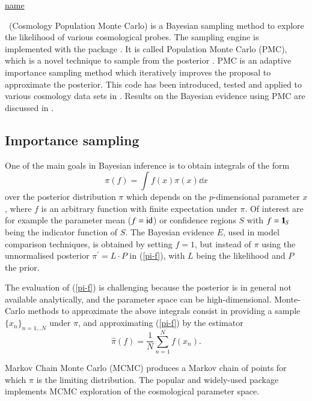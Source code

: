 \documentclass[11pt, chapterprefix, headsepline]{scrartcl}
\begin{document}
\hyperlink{spec}{name}

\CosmoPMC\ (Cosmology Population Monte Carlo) is a Bayesian sampling
method to explore the likelihood of various cosmological probes. The
sampling engine is implemented with the package \pmclib. It is called
Population Monte Carlo (PMC), which is a novel technique to sample from
the posterior \citep{cappe:douc:guillin:marin:robert:2007}. PMC is an
adaptive importance sampling method which iteratively improves the
proposal to approximate the posterior. This code has
been introduced, tested and applied to various cosmology data sets in
\citet{WK09}. Results on the Bayesian evidence using PMC are discussed
in \cite{KWR10}.

\subsection{Importance sampling}


One of the main goals in Bayesian inference is to obtain integrals of
the form
%
\begin{equation}
  \pi(f) = \int f(x) \pi(x) \dd x
  \label{pi-f}
\end{equation}
%
over the posterior distribution $\pi$ which depends on the
$p$-dimensional parameter
$x$, where $f$ is an arbitrary function with finite expectation under
$\pi$. Of interest are for example the parameter mean ($f = {\rm
  id}$) or confidence regions $S$ with $f={\mathbf 1}_{S}$ being the indicator
function of $S$. The Bayesian evidence $E$, used in model comparison
techniques, is obtained by setting $f=1$, but instead of $\pi$ using the unnormalised
posterior $\pi^\prime = L \cdot P$ in (\ref{pi-f}), with $L$ being
the likelihood and $P$ the prior.

The evaluation of (\ref{pi-f}) is challenging because
the posterior is in general not available analytically, and the
parameter space can be high-dimensional. Monte-Carlo methods to
approximate the above integrals consist in providing a sample
$\{x_n\}_{n=1 \ldots N}$
under $\pi$, and approximating (\ref{pi-f}) by the estimator
%
\begin{equation}
  \hat \pi(f) = \frac 1 N \sum_{n=1}^N f(x_n).
  \label{hat-pi-f}
\end{equation}

Markov Chain Monte Carlo (MCMC) produces a Markov chain of points for
which $\pi$ is the limiting distribution. The popular and widely-used
package 
\citep[\url{http://cosmologist.info/cosmomc};][]{cosmomc} implements MCMC
exploration of the cosmological parameter space.
\end{document}
